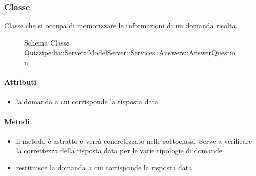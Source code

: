 \subsubsection{Classe }
Classe che si occupa di memorizzare le informazioni di un domanda risolta.
\begin{figure}[H]
\centering
\noindent{}
\caption[Schema Classe AnswerQuestion]{Schema Classe Quizzipedia::Server::ModelServer::Services::Answers::AnswerQuestion}
\end{figure}
\paragraph{Attributi}
\begin{itemize}
\item {}
\newline
la domanda a cui corrisponde la risposta data
\end{itemize}
\paragraph{Metodi}
\begin{itemize}
\item {}
\newline
il metodo è astratto e verrà concretizzato nelle sottoclassi. Serve a verificare la correttezza della risposta data per le varie tipologie di domande
\newline
\item {}
\newline
restituisce la domanda a cui corrisponde la risposta data
\newline
\end{itemize}
